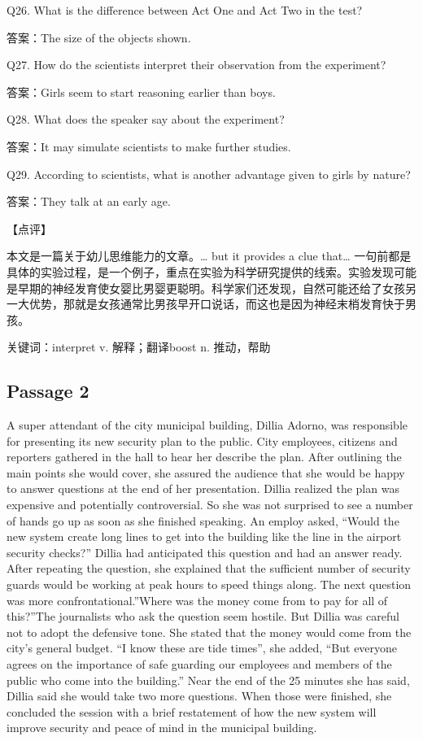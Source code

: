 \documentclass[UTF8,11pt]{ctexart}
\begin{document}
Q26. What is the difference between Act One and Act Two in the test?


答案：The size of the objects shown.


Q27. How do the scientists interpret their observation from the experiment?


答案：Girls seem to start reasoning earlier than boys.


Q28. What does the speaker say about the experiment?


答案：It may simulate scientists to make further studies.


Q29. According to scientists, what is another advantage given to girls by nature?


答案：They talk at an early age.


【点评】


本文是一篇关于幼儿思维能力的文章。… but it provides a clue that… 一句前都是具体的实验过程，是一个例子，重点在实验为科学研究提供的线索。实验发现可能是早期的神经发育使女婴比男婴更聪明。科学家们还发现，自然可能还给了女孩另一大优势，那就是女孩通常比男孩早开口说话，而这也是因为神经末梢发育快于男孩。


关键词：interpret v. 解释；翻译boost n. 推动，帮助


\subsection*{Passage 2}


A super attendant of the city municipal building, Dillia Adorno, was responsible for presenting its new security plan to the public. City employees, citizens and reporters gathered in the hall to hear her describe the plan. After outlining the main points she would cover, she assured the audience that she would be happy to answer questions at the end of her presentation. Dillia realized the plan was expensive and potentially controversial. So she was not surprised to see a number of hands go up as soon as she finished speaking. An employ asked, “Would the new system create long lines to get into the building like the line in the airport security checks?” Dillia had anticipated this question and had an answer ready. After repeating the question, she explained that the sufficient number of security guards would be working at peak hours to speed things along. The next question was more confrontational.”Where was the money come from to pay for all of this?”The journalists who ask the question seem hostile. But Dillia was careful not to adopt the defensive tone. She stated that the money would come from the city’s general budget. “I know these are tide times”, she added, “But everyone agrees on the importance of safe guarding our employees and members of the public who come into the building.” Near the end of the 25 minutes she has said, Dillia said she would take two more questions. When those were finished, she concluded the session with a brief restatement of how the new system will improve security and peace of mind in the municipal building.
\end{document}
